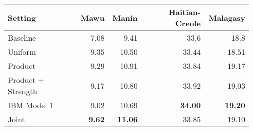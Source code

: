 \begin{tabular}{lrrrr}
\toprule
Setting & Mawu & Manin & Haitian-Creole & Malagasy \\
\toprule
Baseline & 7.08 & 9.41 & 33.6 & 18.8 \\
Uniform & 9.35 & 10.50 & 33.44 & 18.51 \\ 
\midrule
Product & 9.29 & 10.91 & 33.84 & 19.17 \\
Product + Strength & 9.17  & 10.80 & 33.92 & 19.03 \\
IBM Model 1 & 9.02 & 10.69 & \textbf{34.00} & \textbf{19.20} \\
Joint & \textbf{9.62} & \textbf{11.06} & 33.85 & 19.10 \\
\bottomrule
\end{tabular}